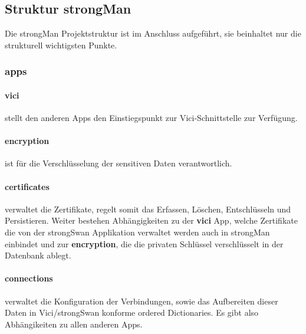 \subsection{Struktur strongMan}
Die strongMan Projektstruktur ist im Anschluss aufgeführt, sie beinhaltet nur die strukturell wichtigsten Punkte.\\
\begin{figure}[H]
\end{figure}

\medskip

\subsubsection{apps}
\par
\begingroup
\leftskip=0.5cm 
\noindent
\paragraph{vici} stellt den anderen Apps den Einstiegspunkt zur Vici-Schnittstelle zur Verfügung. 

\paragraph{encryption} ist für die Verschlüsselung der sensitiven Daten verantwortlich.

\paragraph{certificates} verwaltet die Zertifikate, regelt somit das Erfassen, Löschen, Entschlüsseln und Persistieren. Weiter bestehen Abhängigkeiten zu der \textbf{vici} App, welche Zertifikate die von der strongSwan Applikation
verwaltet werden auch in strongMan einbindet und zur \textbf{encryption}, die die privaten Schlüssel verschlüsselt in der Datenbank ablegt.

\paragraph{connections} verwaltet die Konfiguration der Verbindungen, sowie das Aufbereiten dieser Daten in Vici/strongSwan konforme ordered Dictionaries. Es gibt also Abhängikeiten zu allen anderen Apps.

\par
\endgroup

